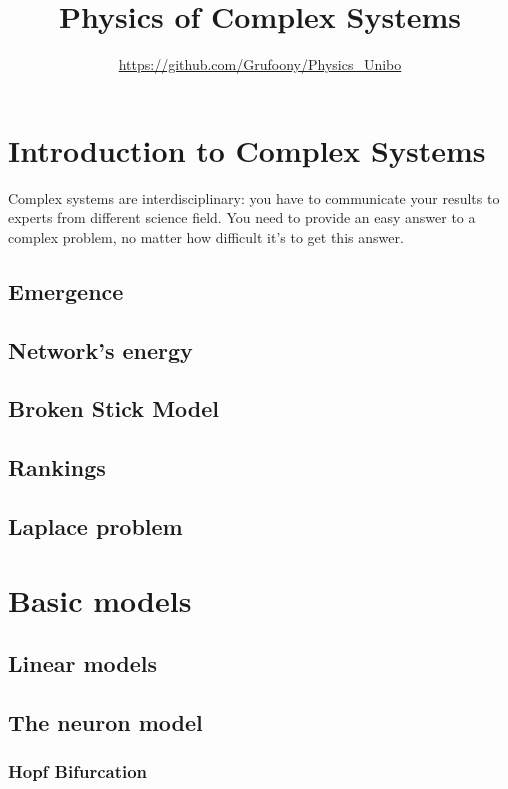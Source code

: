 \documentclass[12pt]{book}
\title{Physics of Complex Systems} \author{\url{https://github.com/Grufoony/Physics_Unibo}}
\date{}
\begin{document}
\maketitle
\tableofcontents
\pagebreak

\chapter{Introduction to Complex Systems}
Complex systems are interdisciplinary: you have to communicate your results to experts from different science field.
You need to provide an easy answer to a complex problem, no matter how difficult it's to get this answer.
\section{Emergence}

\section{Network's energy}

\section{Broken Stick Model}

\section{Rankings}

\section{Laplace problem}

\chapter{Basic models}
\section{Linear models}

\section{The neuron model}

\subsection{Hopf Bifurcation}

\end{document}
